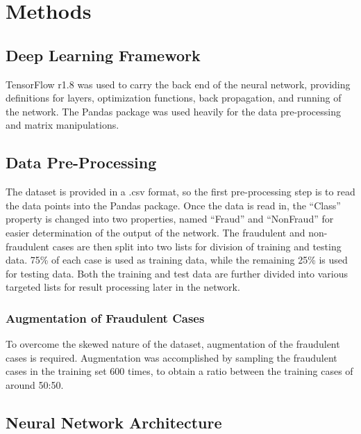 \documentclass{article}
\begin{document}
\section{Methods}


\subsection{Deep Learning Framework}

 TensorFlow r1.8 was used to carry the back end of the neural network, providing definitions
 for layers, optimization functions, back propagation, and running of the network. The Pandas 
 package was used heavily for the data pre-processing and matrix manipulations.

\subsection{Data Pre-Processing}

 The dataset is provided in a .csv format, so the first pre-processing step is to read the data points 
 into the Pandas package. Once the data is read in, the “Class” property is changed into two properties,
 named “Fraud” and “NonFraud” for easier determination of the output of the network. The fraudulent 
 and non-fraudulent cases are then split into two lists for division of training and testing data. 75\% 
 of each case is used as training data, while the remaining  25\% is used for testing data. Both the 
 training and test data are further divided into various targeted lists for result processing later in the network.

\subsubsection{Augmentation of Fraudulent Cases}

 To overcome the skewed nature of the dataset, augmentation of the fraudulent cases is required. 
 Augmentation was accomplished by sampling the fraudulent cases in the training set 600 times, 
 to obtain a ratio between the training cases of around 50:50.


\subsection{Neural Network Architecture}
\end{document}

